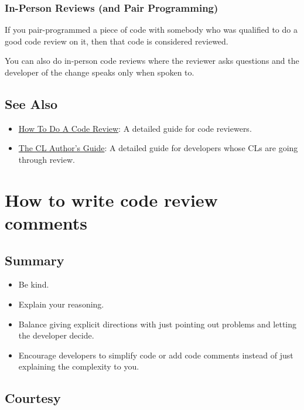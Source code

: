 \documentclass[
]{article}
\providecommand{\tightlist}{%
  \setlength{\itemsep}{0pt}\setlength{\parskip}{0pt}}
\begin{document}
\subsubsection{In-Person Reviews (and Pair
Programming)}\label{in_person}

If you pair-programmed a piece of code with somebody who was qualified
to do a good code review on it, then that code is considered reviewed.

You can also do in-person code reviews where the reviewer asks questions
and the developer of the change speaks only when spoken to.

\subsection{See Also}\label{seealso}

\begin{itemize}
\tightlist
\item
  \href{reviewer/index.md}{How To Do A Code Review}: A detailed guide
  for code reviewers.
\item
  \href{developer/index.md}{The CL Author's Guide}: A detailed guide for
  developers whose CLs are going through review.
\end{itemize}

\section{How to write code review
comments}\label{how-to-write-code-review-comments}

\subsection{Summary}\label{summary}

\begin{itemize}
\tightlist
\item
  Be kind.
\item
  Explain your reasoning.
\item
  Balance giving explicit directions with just pointing out problems and
  letting the developer decide.
\item
  Encourage developers to simplify code or add code comments instead of
  just explaining the complexity to you.
\end{itemize}

\subsection{Courtesy}\label{courtesy}
\end{document}

